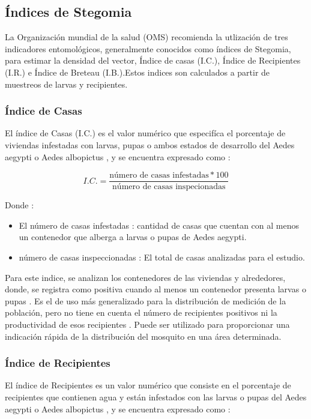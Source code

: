 
\subsection{Índices de Stegomia}
\label{sec:densidad-vectorial-indices-stegomia}
La Organización mundial de la salud (OMS) recomienda la utlización de tres indicadores
entomológicos, generalmente conocidos como índices de Stegomia, para estimar la densidad del
vector, Índice de casas (I.C.), Índice de Recipientes (I.R.) e Índice de Breteau (I.B.).Estos
indices son calculados a partir de muestreos de larvas y recipientes.

\subsubsection{Índice de Casas}
El índice de Casas (I.C.) es el valor numérico que especifíca el porcentaje de viviendas
infestadas con larvas, pupas o ambos estados de desarrollo del Aedes aegypti o Aedes albopictus
\cite{ibanez1995vectores, world2009dengue}, y se encuentra expresado como :

\begin{equation}
I.C. = \frac{\text{número de casas infestadas} * 100}{\text{número de casas inspecionadas}}
\end{equation}

Donde :
\begin{itemize}
\item El número de casas infestadas : cantidad de casas que cuentan con al menos un contenedor que alberga a larvas o pupas de Aedes aegypti.
\item número de casas inspeccionadas : El total de casas analizadas para el estudio.
\end{itemize}

Para este indice, se analizan los contenedores de las viviendas y alrededores, donde, se registra
como positiva cuando al menos un contenedor presenta larvas o pupas \cite{ibanez1995vectores}. Es
el de uso más generalizado para la distribución de medición de la población, pero no tiene en
cuenta el número de recipientes positivos ni la productividad de esos recipientes
\cite{world2009dengue}. Puede ser utilizado para proporcionar una indicación rápida de la
distribución del mosquito en una área determinada.

\subsubsection{Índice de Recipientes}
El índice de Recipientes es un valor numérico que consiste en el porcentaje de recipientes que
contienen agua y están infestados con las larvas o pupas del Aedes aegypti o Aedes albopictus
\cite{ibanez1995vectores, world2009dengue}, y se encuentra expresado como :

